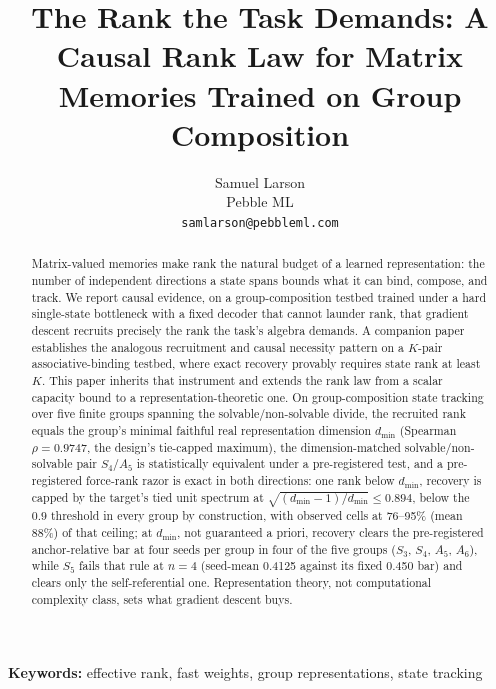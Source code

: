 \documentclass{article}
\title{The Rank the Task Demands:
A Causal Rank Law for Matrix Memories Trained on Group Composition}
\author{%
  Samuel Larson\\
  Pebble ML\\
  \texttt{samlarson@pebbleml.com}%
}
\theoremstyle{plain}
\newcommand{\dmin}{d_{\min}}
\begin{document}
\maketitle

\begin{abstract}
Matrix-valued memories make rank the natural budget of a learned
representation: the number of independent directions a state spans bounds
what it can bind, compose, and track. We report causal evidence, on a
group-composition testbed trained under a hard single-state bottleneck
with a fixed decoder that cannot launder rank, that gradient descent
recruits precisely the rank the task's algebra demands. A companion
paper \citep{larson2026companion} establishes the analogous recruitment
and causal necessity pattern on a $K$-pair associative-binding testbed,
where exact recovery provably requires state rank at least $K$. This
paper inherits that instrument and extends the rank law from a scalar
capacity bound to a representation-theoretic one.
On
group-composition state tracking over five finite groups spanning the
solvable/non-solvable divide, the recruited rank equals the group's minimal
faithful real representation dimension $\dmin$ (Spearman $\rho = 0.9747$,
the design's tie-capped maximum),
the dimension-matched solvable/non-solvable
pair $S_4$/$A_5$ is statistically equivalent under a pre-registered
test,
and a pre-registered force-rank razor is exact in both
directions: one rank below $\dmin$, recovery is capped by the target's
tied unit spectrum at $\sqrt{(\dmin{-}1)/\dmin} \le 0.894$, below the
$0.9$ threshold in every group by construction, with observed cells
at 76--95\% (mean 88\%) of that ceiling;
at $\dmin$, not
guaranteed a priori, recovery clears the pre-registered
anchor-relative bar at four seeds per group in four of the five groups
($S_3$, $S_4$, $A_5$, $A_6$), while $S_5$ fails that rule at $n = 4$
(seed-mean 0.4125 against its fixed 0.450 bar) and clears only the
self-referential one.
Representation theory, not
computational complexity class, sets what gradient descent buys.
\end{abstract}

\noindent\textbf{Keywords:} effective rank, fast weights, group
representations, state tracking














\end{document}

